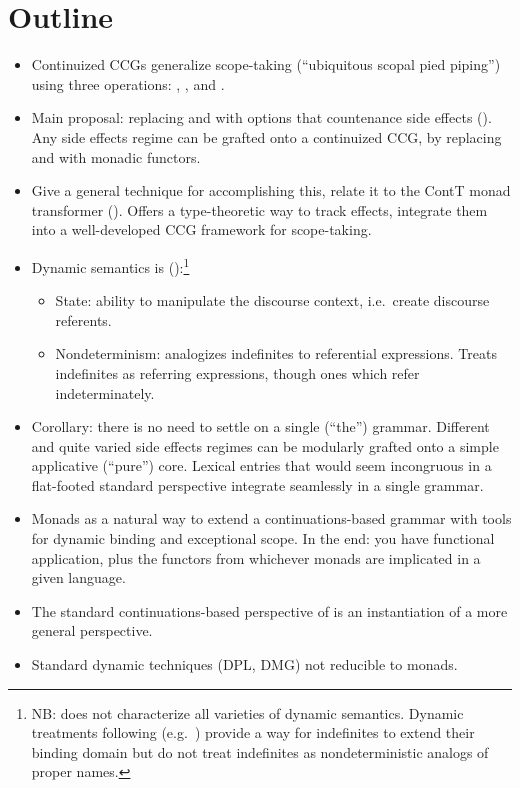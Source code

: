 \section{Outline}
\begin{itemize}	
	\item Continuized CCGs generalize scope-taking (``ubiquitous scopal pied piping'') using three operations: , , and . %
	
	\item Main proposal: replacing  and  with options that countenance side effects (\citealt{Shan:2005}). Any side effects regime can be grafted onto a continuized CCG, by replacing  and  with monadic functors.%
	
	\item Give a general technique for accomplishing this, relate it to the ContT monad transformer (\citealt{Liangetal}). Offers a type-theoretic way to track effects, integrate them into a well-developed CCG framework for scope-taking.%
	
	\item Dynamic semantics is (\citealt{Shan:2001}):\footnote{NB: does not characterize all varieties of dynamic semantics. Dynamic treatments following \citealt{GroenendijkStokhof:1990} (e.g.~\citealt{Zimmermann:1991, Dekker:1993, Szabolcsi:2003, Groote:2006}) provide a way for indefinites to extend their binding domain but do not treat indefinites as nondeterministic analogs of proper names.}%
	\begin{itemize}
		\item State: ability to manipulate the discourse context, i.e.~create discourse referents.%
		\item Nondeterminism: analogizes indefinites to referential expressions. Treats indefinites as referring expressions, though ones which refer indeterminately.%
	\end{itemize}
	
	\item Corollary: there is no need to settle on a single (``the'') grammar. Different and quite varied side effects regimes can be modularly grafted onto a simple applicative (``pure'') core. Lexical entries that would seem incongruous in a flat-footed standard perspective integrate seamlessly in a single grammar. %
	
	\item Monads as a natural way to extend a continuations-based grammar with tools for dynamic binding and exceptional scope. In the end: you have functional application, plus the functors from whichever monads are implicated in a given language. %
	
	\item The standard continuations-based perspective of \citealt{Barker:2002, ShanBarker:2006, BarkerShan:2014} is an instantiation of a more general perspective.%
	
	\item Standard dynamic techniques (DPL, DMG) not reducible to monads. 
\end{itemize}

